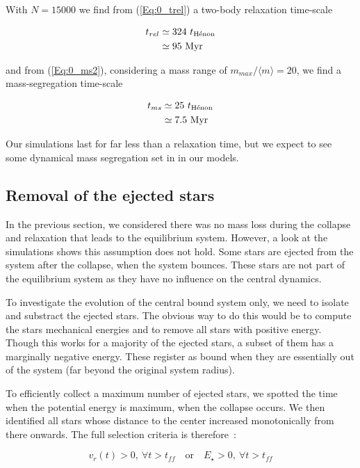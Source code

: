 With $N = 15 000$  we find from (\ref{Eq:0_trel}) a two-body relaxation time-scale

\begin{align}
t_{rel}  &\simeq 324~ t_{\textrm{H\'enon}}\\
	     &\simeq 95~ {\textrm{Myr}}
\end{align}

and from (\ref{Eq:0_ms2}), considering a mass range of $m_{max}/\langle m\rangle = 20$, we find a mass-segregation time-scale

\begin{align}
t_{ms}  &\simeq 25~ t_{\textrm{H\'enon}}\\
	    &\simeq 7.5~ {\textrm{Myr}}
\end{align}

Our simulations last for far less than a relaxation time, but we expect to see some dynamical mass segregation set in in our models.


\subsection{Removal of the ejected stars}

In the previous section, we considered there was no mass loss during the collapse and relaxation that leads to the equilibrium system. However, a look at the simulations shows this assumption does not hold. Some stars are ejected from the system after the collapse, when the system bounces. These stars are not part of the equilibrium system as they have no influence on the central dynamics.

To investigate the evolution of the central bound system only, we need to isolate and substract the ejected stars. The obvious way to do this would be to compute the stars mechanical energies and to remove all stars with positive energy. Though this works for a majority of the ejected stars, a subset of them has a marginally negative energy. These register as bound when they are essentially out of the system (far beyond the original system radius). 

To efficiently collect a maximum number of ejected stars, we spotted the time when the potential energy is maximum, when the collapse occurs. We  then identified all stars whose distance to the center increased monotonically from there onwards. The full selection criteria is therefore~:

\begin{equation}
v_r(t) > 0,~\forall t > t_{ff}\quad \textrm{or} \quad  E_\star > 0 , ~\forall t > t_{ff}
\end{equation}
 

